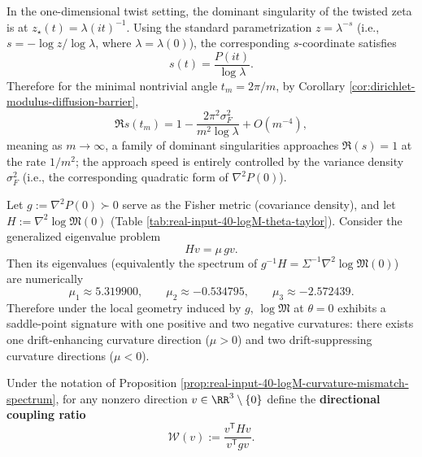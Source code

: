 \begin{remark}[``Siegel Strip''-Type Approach: Twisted Dominant Poles Approach \texorpdfstring{$\Re(s)=1$}{Re(s)=1} at Rate \texorpdfstring{$1/m^2$}{1/m2}]
In the one-dimensional twist setting, the dominant singularity of the twisted zeta is at
\(
z_\star(t)=\lambda(it)^{-1}
\).
Using the standard parametrization \(z=\lambda^{-s}\) (i.e., \(s=-\log z/\log\lambda\), where \(\lambda=\lambda(0)\)), the corresponding \(s\)-coordinate satisfies
\[
s(t)=\frac{P(it)}{\log\lambda}.
\]
Therefore for the minimal nontrivial angle \(t_m=2\pi/m\), by Corollary \ref{cor:dirichlet-modulus-diffusion-barrier},
\[
\Re s(t_m)
=1-\frac{2\pi^2\sigma_F^2}{m^2\log\lambda}+O(m^{-4}),
\]
meaning as \(m\to\infty\), a family of dominant singularities approaches \(\Re(s)=1\) at the rate \(1/m^2\); the approach speed is entirely controlled by the variance density \(\sigma_F^2\) (i.e., the corresponding quadratic form of \(\nabla^2P(0)\)).
\end{remark}

\begin{proposition}\label{prop:real-input-40-logM-curvature-mismatch-spectrum}
Let \(g:=\nabla^2P(0)\succ 0\) serve as the Fisher metric (covariance density), and let \(H:=\nabla^2\log\mathfrak{M}(0)\) (Table \ref{tab:real-input-40-logM-theta-taylor}).
Consider the generalized eigenvalue problem
\[
Hv=\mu\,gv.
\]
Then its eigenvalues (equivalently the spectrum of \(g^{-1}H=\Sigma^{-1}\nabla^2\log\mathfrak{M}(0)\)) are numerically
\[
\mu_1\approx 5.319900,\qquad
\mu_2\approx -0.534795,\qquad
\mu_3\approx -2.572439.
\]
Therefore under the local geometry induced by \(g\), \(\log\mathfrak{M}\) at \(\theta=0\) exhibits a saddle-point signature with one positive and two negative curvatures: there exists one drift-enhancing curvature direction (\(\mu>0\)) and two drift-suppressing curvature directions (\(\mu<0\)).
\end{proposition}

\begin{definition}\label{def:real-input-40-directional-coupling}
Under the notation of Proposition \ref{prop:real-input-40-logM-curvature-mismatch-spectrum},
for any nonzero direction \(v\in\RR^3\setminus\{0\}\) define the \textbf{directional coupling ratio}
\[
\mathcal{W}(v):=\frac{v^{\mathsf T}Hv}{v^{\mathsf T}gv}.
\]
\end{definition}

